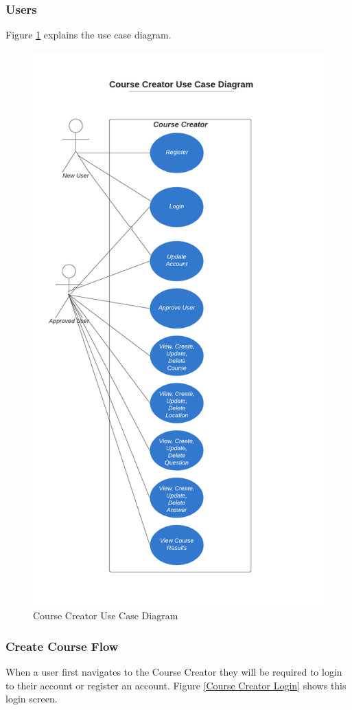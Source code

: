 \subsubsection{Users}
Figure \ref{Course Creator Use Case Diagram} explains the use case diagram.

\begin{figure}[htb]
	\centering
	\includegraphics[width=.6\textwidth]{Requirements/assets/course-creator-use-case-diagram.png}
	\caption[Course Creator Use Case Diagram]{\label{Course Creator Use Case Diagram}Course Creator Use Case Diagram}
\end{figure}

\subsubsection{Create Course Flow}
When a user first navigates to the Course Creator they will be required to login to their account or register an account. Figure \ref{Course Creator Login} shows this login screen.

